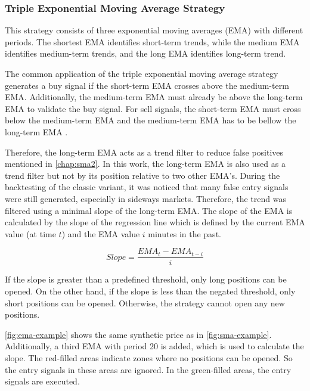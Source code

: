 \subsubsection{Triple Exponential Moving Average Strategy}

This strategy consists of three exponential moving averages (EMA) with different periods.
The shortest EMA identifies short-term trends, while the medium EMA identifies medium-term trends, and the long EMA identifies long-term trend.

The common application of the triple exponential moving average strategy generates a buy signal if the short-term EMA crosses above the medium-term EMA.
Additionally, the medium-term EMA must already be above the long-term EMA to validate the buy signal.
For sell signals, the short-term EMA must cross below the medium-term EMA and the medium-term EMA has to be bellow the long-term EMA \cite{ema3-basics}.

Therefore, the long-term EMA acts as a trend filter to reduce false positives mentioned in \autoref{chap:sma2}.
In this work, the long-term EMA is also used as a trend filter but not by its position relative to two other EMA's.
During the backtesting of the classic variant, it was noticed that many false entry signals were still generated, especially in sideways markets.
Therefore, the trend was filtered using a minimal slope of the long-term EMA.
The slope of the EMA is calculated by the slope of the regression line which is defined by the current EMA value (at time $t$) and the EMA value $i$ minutes in the past.

\[
    Slope = \frac{EMA_t - EMA_{t-i}}{i}
\]

If the slope is greater than a predefined threshold, only long positions can be opened.
On the other hand, if the slope is less than the negated threshold, only short positions can be opened.
Otherwise, the strategy cannot open any new positions.

\autoref{fig:ema-example} shows the same synthetic price as in \autoref{fig:sma-example}.
Additionally, a third EMA with period 20 is added, which is used to calculate the slope.
The red-filled areas indicate zones where no positions can be opened.
So the entry signals in these areas are ignored.
In the green-filled areas, the entry signals are executed.

